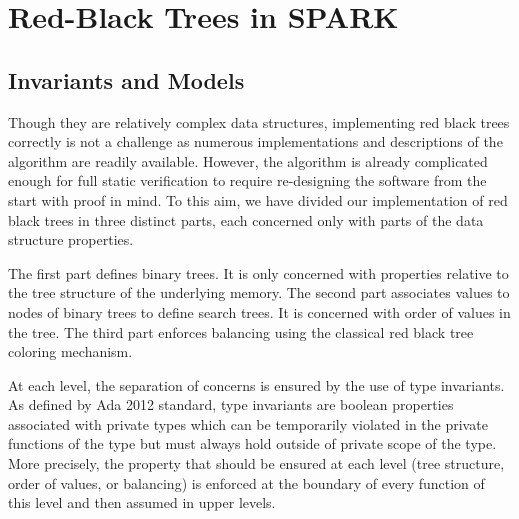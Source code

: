 \documentclass[11pt,a4paper]{article}
\begin{document}
\section{Red-Black Trees in SPARK}
\subsection{Invariants and Models}
\label{sec-rbt-inv}


Though they are relatively complex data structures, implementing red black trees
correctly is not a challenge as numerous implementations and descriptions of the
algorithm are readily available. However, the algorithm is already complicated
enough for full static verification to require re-designing the
software from the start with proof in mind.
To this aim, we have divided our implementation of red black trees in three
distinct parts, each concerned only with parts of the data structure properties.

The first part defines binary trees. It is only concerned with properties
relative to the tree structure of the underlying memory.
The second part associates values to nodes of binary trees to define search trees.
It is concerned with order of values in the tree.
The third part enforces balancing using the classical red black tree coloring
mechanism.

At each level, the separation of concerns is ensured by the use of type invariants.
As defined by Ada 2012 standard, type invariants are boolean properties associated
with private types which can be temporarily violated in the private functions of the
type but must always hold outside of private scope of the type.
More precisely, the property that should be ensured at each level (tree structure,
order of values, or balancing) is enforced at the boundary of every function
of this level and then assumed in upper levels.
\end{document}
